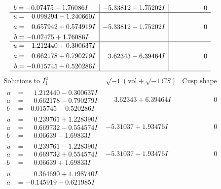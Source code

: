 \documentclass[1p]{elsarticle_modified}
\theoremstyle{definition}
\newcommand{\I}{\sqrt{-1}}
\begin{document}
$$\begin{array}{c|c|c}
\begin{aligned}
b &= -0.07475 - 1.76086 I\end{aligned}
 & -5.33812 + 1.75202 I & \phantom{-0.000000 } 0 \\ \hline\begin{aligned}
u &= \phantom{-}0.098294 - 1.240660 I \\
a &= \phantom{-}0.657942 + 0.574919 I \\
b &= -0.07475 + 1.76086 I\end{aligned}
 & -5.33812 - 1.75202 I & \phantom{-0.000000 } 0 \\ \hline\begin{aligned}
u &= \phantom{-}1.212440 + 0.300637 I \\
a &= \phantom{-}0.662178 + 0.790279 I \\
b &= -0.015745 + 0.520286 I\end{aligned}
 & \phantom{-}3.62343 - 6.39464 I & \phantom{-0.000000 } 0\\
 \hline 
 \end{array}$$\newpage$$\begin{array}{c|c|c}  
\text{Solutions to }I^u_{1}& \I (\text{vol} + \sqrt{-1}CS) & \text{Cusp shape}\\
 \hline 
\begin{aligned}
u &= \phantom{-}1.212440 - 0.300637 I \\
a &= \phantom{-}0.662178 - 0.790279 I \\
b &= -0.015745 - 0.520286 I\end{aligned}
 & \phantom{-}3.62343 + 6.39464 I & \phantom{-0.000000 } 0 \\ \hline\begin{aligned}
u &= \phantom{-}0.239761 + 1.228390 I \\
a &= \phantom{-}0.669732 - 0.554574 I \\
b &= \phantom{-}0.06639 - 1.69833 I\end{aligned}
 & -5.31037 + 1.93476 I & \phantom{-0.000000 } 0 \\ \hline\begin{aligned}
u &= \phantom{-}0.239761 - 1.228390 I \\
a &= \phantom{-}0.669732 + 0.554574 I \\
b &= \phantom{-}0.06639 + 1.69833 I\end{aligned}
 & -5.31037 - 1.93476 I & \phantom{-0.000000 } 0 \\ \hline\begin{aligned}
u &= \phantom{-}0.364690 + 1.198740 I \\
a &= -0.145919 + 0.621985 I \\

\end{aligned}
\end{array}$$
\end{document}
